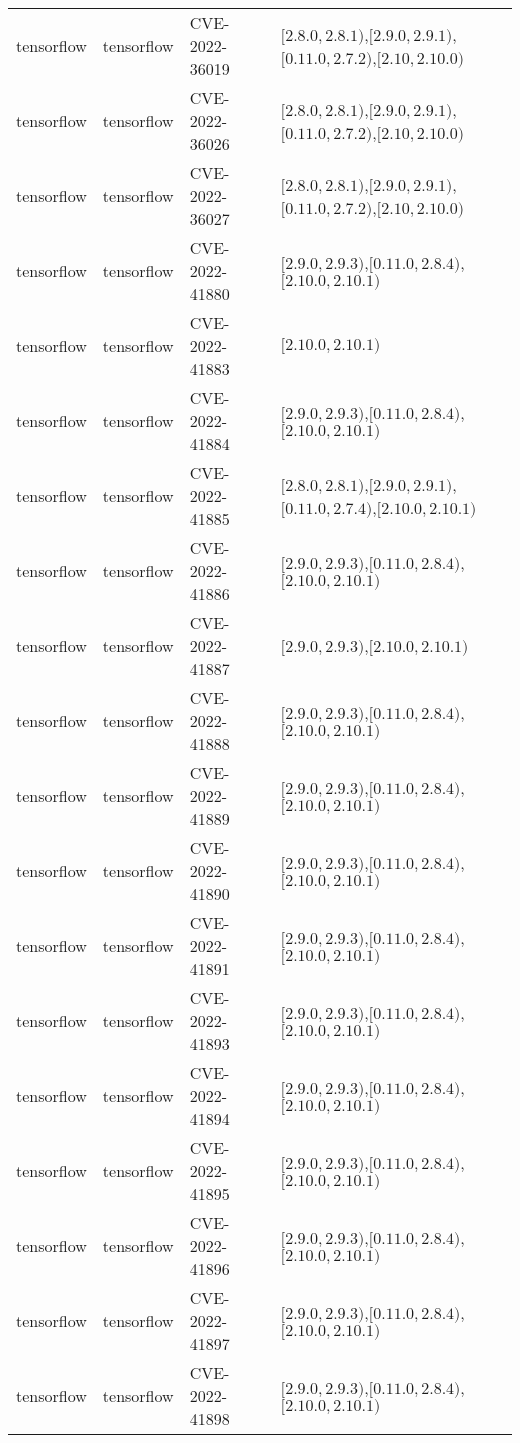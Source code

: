 \begin{tabular}{llll}
tensorflow & tensorflow & CVE-2022-36019 & $[2.8.0,2.8.1)$,$[2.9.0,2.9.1)$,$[0.11.0,2.7.2)$,$[2.10,2.10.0)$ \\
tensorflow & tensorflow & CVE-2022-36026 & $[2.8.0,2.8.1)$,$[2.9.0,2.9.1)$,$[0.11.0,2.7.2)$,$[2.10,2.10.0)$ \\
tensorflow & tensorflow & CVE-2022-36027 & $[2.8.0,2.8.1)$,$[2.9.0,2.9.1)$,$[0.11.0,2.7.2)$,$[2.10,2.10.0)$ \\
tensorflow & tensorflow & CVE-2022-41880 & $[2.9.0,2.9.3)$,$[0.11.0,2.8.4)$,$[2.10.0,2.10.1)$ \\
tensorflow & tensorflow & CVE-2022-41883 & $[2.10.0,2.10.1)$ \\
tensorflow & tensorflow & CVE-2022-41884 & $[2.9.0,2.9.3)$,$[0.11.0,2.8.4)$,$[2.10.0,2.10.1)$ \\
tensorflow & tensorflow & CVE-2022-41885 & $[2.8.0,2.8.1)$,$[2.9.0,2.9.1)$,$[0.11.0,2.7.4)$,$[2.10.0,2.10.1)$ \\
tensorflow & tensorflow & CVE-2022-41886 & $[2.9.0,2.9.3)$,$[0.11.0,2.8.4)$,$[2.10.0,2.10.1)$ \\
tensorflow & tensorflow & CVE-2022-41887 & $[2.9.0,2.9.3)$,$[2.10.0,2.10.1)$ \\
tensorflow & tensorflow & CVE-2022-41888 & $[2.9.0,2.9.3)$,$[0.11.0,2.8.4)$,$[2.10.0,2.10.1)$ \\
tensorflow & tensorflow & CVE-2022-41889 & $[2.9.0,2.9.3)$,$[0.11.0,2.8.4)$,$[2.10.0,2.10.1)$ \\
tensorflow & tensorflow & CVE-2022-41890 & $[2.9.0,2.9.3)$,$[0.11.0,2.8.4)$,$[2.10.0,2.10.1)$ \\
tensorflow & tensorflow & CVE-2022-41891 & $[2.9.0,2.9.3)$,$[0.11.0,2.8.4)$,$[2.10.0,2.10.1)$ \\
tensorflow & tensorflow & CVE-2022-41893 & $[2.9.0,2.9.3)$,$[0.11.0,2.8.4)$,$[2.10.0,2.10.1)$ \\
tensorflow & tensorflow & CVE-2022-41894 & $[2.9.0,2.9.3)$,$[0.11.0,2.8.4)$,$[2.10.0,2.10.1)$ \\
tensorflow & tensorflow & CVE-2022-41895 & $[2.9.0,2.9.3)$,$[0.11.0,2.8.4)$,$[2.10.0,2.10.1)$ \\
tensorflow & tensorflow & CVE-2022-41896 & $[2.9.0,2.9.3)$,$[0.11.0,2.8.4)$,$[2.10.0,2.10.1)$ \\
tensorflow & tensorflow & CVE-2022-41897 & $[2.9.0,2.9.3)$,$[0.11.0,2.8.4)$,$[2.10.0,2.10.1)$ \\
tensorflow & tensorflow & CVE-2022-41898 & $[2.9.0,2.9.3)$,$[0.11.0,2.8.4)$,$[2.10.0,2.10.1)$ \\

\end{tabular}
